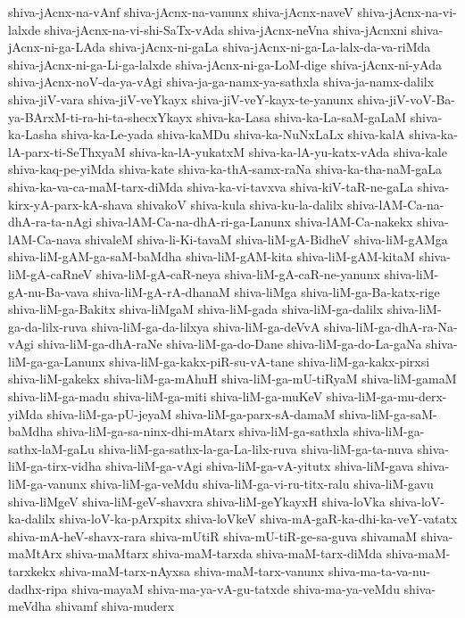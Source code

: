 {shiva-jAcnx-na-vAnf
shiva-jAcnx-na-vanunx
shiva-jAcnx-naveV
shiva-jAcnx-na-vi-lalxde
shiva-jAcnx-na-vi-shi-SaTx-vAda
shiva-jAcnx-neVna
shiva-jAcnxni
shiva-jAcnx-ni-ga-LAda
shiva-jAcnx-ni-gaLa
shiva-jAcnx-ni-ga-La-lalx-da-va-riMda
shiva-jAcnx-ni-ga-Li-ga-lalxde
shiva-jAcnx-ni-ga-LoM-dige
shiva-jAcnx-ni-yAda
shiva-jAcnx-noV-da-ya-vAgi
shiva-ja-ga-namx-ya-sathxla
shiva-ja-namx-dalilx
shiva-jiV-vara
shiva-jiV-veYkayx
shiva-jiV-veY-kayx-te-yanunx
shiva-jiV-voV-Ba-ya-BArxM-ti-ra-hi-ta-shecxYkayx
shiva-ka-Lasa
shiva-ka-La-saM-gaLaM
shiva-ka-Lasha
shiva-ka-Le-yada
shiva-kaMDu
shiva-ka-NuNxLaLx
shiva-kalA
shiva-ka-lA-parx-ti-SeThxyaM
shiva-ka-lA-yukatxM
shiva-ka-lA-yu-katx-vAda
shiva-kale
shiva-kaq-pe-yiMda
shiva-kate
shiva-ka-thA-samx-raNa
shiva-ka-tha-naM-gaLa
shiva-ka-va-ca-maM-tarx-diMda
shiva-ka-vi-tavxva
shiva-kiV-taR-ne-gaLa
shiva-kirx-yA-parx-kA-shava
shivakoV
shiva-kula
shiva-ku-la-dalilx
shiva-lAM-Ca-na-dhA-ra-ta-nAgi
shiva-lAM-Ca-na-dhA-ri-ga-Lanunx
shiva-lAM-Ca-nakekx
shiva-lAM-Ca-nava
shivaleM
shiva-li-Ki-tavaM
shiva-liM-gA-BidheV
shiva-liM-gAMga
shiva-liM-gAM-ga-saM-baMdha
shiva-liM-gAM-kita
shiva-liM-gAM-kitaM
shiva-liM-gA-caRneV
shiva-liM-gA-caR-neya
shiva-liM-gA-caR-ne-yanunx
shiva-liM-gA-nu-Ba-vava
shiva-liM-gA-rA-dhanaM
shiva-liMga
shiva-liM-ga-Ba-katx-rige
shiva-liM-ga-Bakitx
shiva-liMgaM
shiva-liM-gada
shiva-liM-ga-dalilx
shiva-liM-ga-da-lilx-ruva
shiva-liM-ga-da-lilxya
shiva-liM-ga-deVvA
shiva-liM-ga-dhA-ra-Na-vAgi
shiva-liM-ga-dhA-raNe
shiva-liM-ga-do-Dane
shiva-liM-ga-do-La-gaNa
shiva-liM-ga-ga-Lanunx
shiva-liM-ga-kakx-piR-su-vA-tane
shiva-liM-ga-kakx-pirxsi
shiva-liM-gakekx
shiva-liM-ga-mAhuH
shiva-liM-ga-mU-tiRyaM
shiva-liM-gamaM
shiva-liM-ga-madu
shiva-liM-ga-miti
shiva-liM-ga-muKeV
shiva-liM-ga-mu-derx-yiMda
shiva-liM-ga-pU-jeyaM
shiva-liM-ga-parx-sA-damaM
shiva-liM-ga-saM-baMdha
shiva-liM-ga-sa-ninx-dhi-mAtarx
shiva-liM-ga-sathxla
shiva-liM-ga-sathx-laM-gaLu
shiva-liM-ga-sathx-la-ga-La-lilx-ruva
shiva-liM-ga-ta-nuva
shiva-liM-ga-tirx-vidha
shiva-liM-ga-vAgi
shiva-liM-ga-vA-yitutx
shiva-liM-gava
shiva-liM-ga-vanunx
shiva-liM-ga-veMdu
shiva-liM-ga-vi-ru-titx-ralu
shiva-liM-gavu
shiva-liMgeV
shiva-liM-geV-shavxra
shiva-liM-geYkayxH
shiva-loVka
shiva-loV-ka-dalilx
shiva-loV-ka-pArxpitx
shiva-loVkeV
shiva-mA-gaR-ka-dhi-ka-veY-vatatx
shiva-mA-heV-shavx-rara
shiva-mUtiR
shiva-mU-tiR-ge-sa-guva
shivamaM
shiva-maMtArx
shiva-maMtarx
shiva-maM-tarxda
shiva-maM-tarx-diMda
shiva-maM-tarxkekx
shiva-maM-tarx-nAyxsa
shiva-maM-tarx-vanunx
shiva-ma-ta-va-nu-dadhx-ripa
shiva-mayaM
shiva-ma-ya-vA-gu-tatxde
shiva-ma-ya-veMdu
shiva-meVdha
shivamf
shiva-muderx
}

